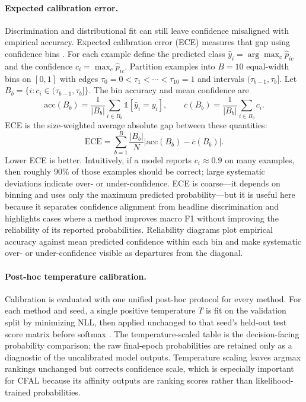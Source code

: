 \documentclass[11pt]{article}
\begin{document}
\paragraph{Expected calibration error.}
Discrimination and distributional fit can still leave confidence misaligned with empirical accuracy. Expected calibration error (ECE) measures that gap using confidence bins \citep{naeini2015obtaining,guo2017calibration}. For each example define the predicted class $\hat{y}_i=\arg\max_c \hat{p}_{ic}$ and the confidence $c_i=\max_c \hat{p}_{ic}$. Partition examples into $B=10$ equal-width bins on $[0,1]$ with edges $\tau_0=0<\tau_1<\cdots<\tau_{10}=1$ and intervals $(\tau_{b-1},\tau_b]$. Let $B_b=\{i: c_i\in(\tau_{b-1},\tau_b]\}$. The bin accuracy and mean confidence are
\begin{equation}
  \mathrm{acc}(B_b)=\frac{1}{|B_b|}\sum_{i\in B_b}\mathbb{1}[\hat{y}_i=y_i],
  \qquad
  \overline{c}(B_b)=\frac{1}{|B_b|}\sum_{i\in B_b} c_i.
  \label{eq:ece-bin}
\end{equation}
\noindent ECE is the size-weighted average absolute gap between these quantities:
\begin{equation}
  \mathrm{ECE} =
  \sum_{b=1}^{B}\frac{|B_b|}{N}
  \left|\mathrm{acc}(B_b)-\overline{c}(B_b)\right|.
  \label{eq:ece}
\end{equation}
\noindent Lower ECE is better. Intuitively, if a model reports $c_i\approx 0.9$ on many examples, then roughly 90\% of those examples should be correct; large systematic deviations indicate over- or under-confidence. ECE is coarse---it depends on binning and uses only the maximum predicted probability---but it is useful here because it separates confidence alignment from headline discrimination and highlights cases where a method improves macro F1 without improving the reliability of its reported probabilities. Reliability diagrams plot empirical accuracy against mean predicted confidence within each bin and make systematic over- or under-confidence visible as departures from the diagonal.

\paragraph{Post-hoc temperature calibration.}
Calibration is evaluated with one unified post-hoc protocol for every method. For each method and seed, a single positive temperature $T$ is fit on the validation split by minimizing NLL, then applied unchanged to that seed's held-out test score matrix before softmax \citep{guo2017calibration}. The temperature-scaled table is the decision-facing probability comparison; the raw final-epoch probabilities are retained only as a diagnostic of the uncalibrated model outputs. Temperature scaling leaves argmax rankings unchanged but corrects confidence scale, which is especially important for CFAL because its affinity outputs are ranking scores rather than likelihood-trained probabilities.
\end{document}
